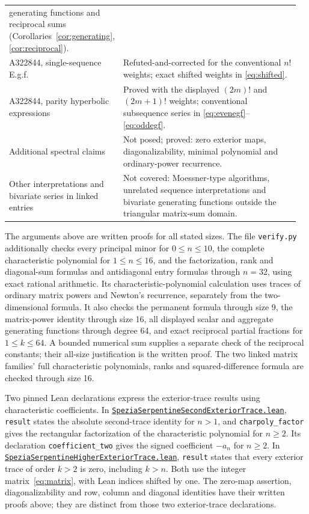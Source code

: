 \documentclass[11pt]{article}
\begin{document}
\begin{longtable}{@{}p{0.30\linewidth}p{0.66\linewidth}@{}}
generating functions and reciprocal sums
(Corollaries~\ref{cor:generating}, \ref{cor:reciprocal}).\\
A322844, single-sequence E.g.f. & Refuted-and-corrected for the conventional
$n!$ weights; exact shifted weights in \eqref{eq:shifted}.\\
A322844, parity hyperbolic expressions & Proved with the displayed
$(2m)!$ and $(2m+1)!$ weights; conventional subsequence series in
\eqref{eq:evenegf}--\eqref{eq:oddegf}.\\
Additional spectral claims & Not posed; proved: zero exterior maps,
diagonalizability, minimal polynomial and ordinary-power recurrence.\\
Other interpretations and bivariate series in linked entries & Not covered:
Moessner-type algorithms, unrelated sequence interpretations and bivariate
generating functions outside the triangular matrix-sum domain.\\\bottomrule
\end{longtable}
\endgroup

The arguments above are written proofs for all stated sizes.
The file \texttt{verify.py} additionally checks every principal minor
for $0\leq n\leq10$, the complete characteristic polynomial for
$1\leq n\leq16$, and the factorization, rank and diagonal-sum formulas
and antidiagonal entry formulas through $n=32$, using exact rational arithmetic.
Its characteristic-polynomial calculation uses traces of ordinary matrix
powers and Newton's recurrence, separately from the two-dimensional formula.
It also checks the permanent formula through size 9, the matrix-power
identity through size 16, all displayed scalar and aggregate generating
functions through degree 64, and exact reciprocal partial fractions for
$1\leq k\leq64$. A bounded numerical sum supplies a separate check of
the reciprocal constants; their all-size justification is the written proof.
The two linked matrix families' full characteristic polynomials, ranks
and squared-difference formula are checked through size 16.

Two pinned Lean declarations express the exterior-trace results using
characteristic coefficients. In
\href{https://github.com/the-omega-institute/trureturing/blob/d9bb8a406783c5222849b798f3c2ab738f653d75/D5/S3/Quantum/Matrix/SpeziaSerpentineSecondExteriorTrace.lean}
{\texttt{SpeziaSerpentineSecondExteriorTrace.lean}},
\texttt{result} states the absolute second-trace identity for $n>1$,
and \texttt{charpoly\_factor} gives the rectangular factorization of the
characteristic polynomial for $n\geq2$.
Its declaration \texttt{coefficient\_two} gives the signed coefficient
$-a_n$ for $n\geq2$.
In
\href{https://github.com/the-omega-institute/trureturing/blob/d9bb8a406783c5222849b798f3c2ab738f653d75/D5/S3/Quantum/Matrix/SpeziaSerpentineHigherExteriorTrace.lean}
{\texttt{SpeziaSerpentineHigherExteriorTrace.lean}},
\texttt{result} states that every exterior trace of order $k>2$ is zero,
including $k>n$. Both use the integer matrix~\eqref{eq:matrix}, with
Lean indices shifted by one. The zero-map assertion, diagonalizability
and row, column and diagonal identities have their written proofs above;
they are distinct from those two exterior-trace declarations.
\end{document}
